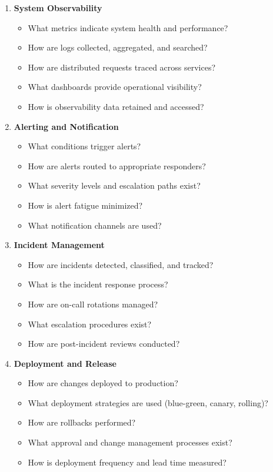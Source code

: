 \documentclass[11pt,letterpaper]{article}
\begin{document}
\begin{enumerate}[label=\textbf{C\arabic*:}, leftmargin=2.5em]
    \item \textbf{System Observability}
    \begin{itemize}[nosep]
        \item What metrics indicate system health and performance?
        \item How are logs collected, aggregated, and searched?
        \item How are distributed requests traced across services?
        \item What dashboards provide operational visibility?
        \item How is observability data retained and accessed?
    \end{itemize}
    
    \item \textbf{Alerting and Notification}
    \begin{itemize}[nosep]
        \item What conditions trigger alerts?
        \item How are alerts routed to appropriate responders?
        \item What severity levels and escalation paths exist?
        \item How is alert fatigue minimized?
        \item What notification channels are used?
    \end{itemize}
    
    \item \textbf{Incident Management}
    \begin{itemize}[nosep]
        \item How are incidents detected, classified, and tracked?
        \item What is the incident response process?
        \item How are on-call rotations managed?
        \item What escalation procedures exist?
        \item How are post-incident reviews conducted?
    \end{itemize}
    
    \item \textbf{Deployment and Release}
    \begin{itemize}[nosep]
        \item How are changes deployed to production?
        \item What deployment strategies are used (blue-green, canary, rolling)?
        \item How are rollbacks performed?
        \item What approval and change management processes exist?
        \item How is deployment frequency and lead time measured?
    \end{itemize}
    

\end{enumerate}
\end{document}
